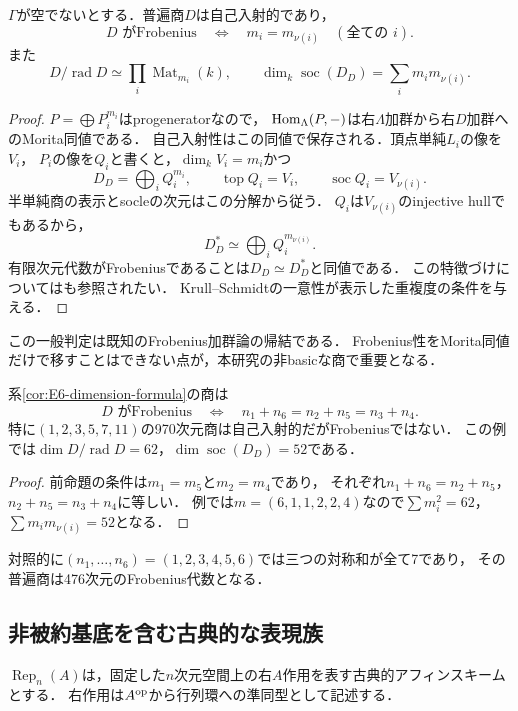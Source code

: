 \begin{proposition}[忘却関手の重複度によるFrobenius判定]\label{prop:quotient-Frobenius}
$\Gamma$が空でないとする．普遍商$D$は自己入射的であり，
\[
 D\text{ がFrobenius}\quad\Longleftrightarrow\quad
 m_i=m_{\nu(i)}\quad(\text{全ての }i).
\]
また
\[
 D/\operatorname{rad}D\simeq\prod_i\operatorname{Mat}_{m_i}(k),\qquad
 \dim_k\operatorname{soc}(D_D)=\sum_i m_im_{\nu(i)}.
\]
\end{proposition}
\begin{proof}
$P=\bigoplus P_i^{m_i}$はprogeneratorなので，
$\operatorname{Hom}_\Lambda(P,-)$は右$\Lambda$加群から右$D$加群へのMorita同値である．
自己入射性はこの同値で保存される．頂点単純$L_i$の像を$V_i$，
$P_i$の像を$Q_i$と書くと，$\dim_kV_i=m_i$かつ
\[
 D_D=\bigoplus_iQ_i^{m_i},\qquad
 \operatorname{top}Q_i=V_i,\qquad
 \operatorname{soc}Q_i=V_{\nu(i)}.
\]
半単純商の表示とsocleの次元はこの分解から従う．
$Q_i$は$V_{\nu(i)}$のinjective hullでもあるから，
\[
 D^*_D\simeq\bigoplus_iQ_i^{m_{\nu(i)}}.
\]
有限次元代数がFrobeniusであることは$D_D\simeq D^*_D$と同値である．
この特徴づけについては\cite[\S2.2]{EtingofRains}も参照されたい．
Krull--Schmidtの一意性が表示した重複度の条件を与える．
\end{proof}
この一般判定は既知のFrobenius加群論の帰結である．
Frobenius性をMorita同値だけで移すことはできない点が，本研究の非basicな商で重要となる．

\begin{corollary}\label{cor:E6-non-Frobenius}
系\ref{cor:E6-dimension-formula}の商は
\[
 D\text{ がFrobenius}\quad\Longleftrightarrow\quad
 n_1+n_6=n_2+n_5=n_3+n_4.
\]
特に$(1,2,3,5,7,11)$の970次元商は自己入射的だがFrobeniusではない．
この例では$\dim D/\operatorname{rad}D=62$，$\dim\operatorname{soc}(D_D)=52$である．
\end{corollary}
\begin{proof}
前命題の条件は$m_1=m_5$と$m_2=m_4$であり，
それぞれ$n_1+n_6=n_2+n_5$，$n_2+n_5=n_3+n_4$に等しい．
例では$m=(6,1,1,2,2,4)$なので$\sum m_i^2=62$，
$\sum m_im_{\nu(i)}=52$となる．
\end{proof}
対照的に$(n_1,\ldots,n_6)=(1,2,3,4,5,6)$では三つの対称和が全て7であり，
その普遍商は476次元のFrobenius代数となる．

\subsection{非被約基底を含む古典的な表現族}
$\operatorname{Rep}_n(A)$は，固定した$n$次元空間上の右$A$作用を表す古典的アフィンスキームとする．
右作用は$A^{\rm op}$から行列環への準同型として記述する．


